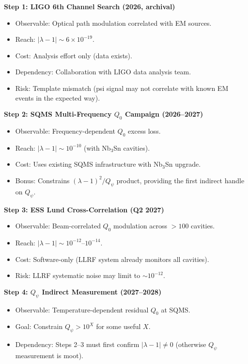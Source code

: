 \documentclass[11pt]{article}
\newcommand{\lam}{\lambda}
\newcommand{\ee}[1]{\times 10^{#1}}
\newcommand{\Qpsi}{Q_\psi}
\newcommand{\lbone}{|\lam - 1|}
\theoremstyle{definition}
\theoremstyle{remark}
\begin{document}
\begin{tcolorbox}[colback=blue!5!white, colframe=blue!50!black,
  title=\textbf{W3i6 P2 Optimal Detection Programme}]

\textbf{Step 1: LIGO 6th Channel Search (2026, archival)}
\begin{itemize}[nosep]
\item Observable: Optical path modulation correlated with EM sources.
\item Reach: $\lbone \sim 6\ee{-19}$.
\item Cost: Analysis effort only (data exists).
\item Dependency: Collaboration with LIGO data analysis team.
\item Risk: Template mismatch (psi signal may not correlate with known
  EM events in the expected way).
\end{itemize}

\textbf{Step 2: SQMS Multi-Frequency $Q_0$ Campaign (2026--2027)}
\begin{itemize}[nosep]
\item Observable: Frequency-dependent $Q_0$ excess loss.
\item Reach: $\lbone \sim 10^{-10}$ (with Nb$_3$Sn cavities).
\item Cost: Uses existing SQMS infrastructure with Nb$_3$Sn upgrade.
\item Bonus: Constrains $(\lam-1)^2/\Qpsi$ product, providing the first
  indirect handle on $\Qpsi$.
\end{itemize}

\textbf{Step 3: ESS Lund Cross-Correlation (Q2 2027)}
\begin{itemize}[nosep]
\item Observable: Beam-correlated $Q_0$ modulation across $>100$ cavities.
\item Reach: $\lbone \sim 10^{-12}$--$10^{-14}$.
\item Cost: Software-only (LLRF system already monitors all cavities).
\item Risk: LLRF systematic noise may limit to $\sim 10^{-12}$.
\end{itemize}

\textbf{Step 4: $\Qpsi$ Indirect Measurement (2027--2028)}
\begin{itemize}[nosep]
\item Observable: Temperature-dependent residual $Q_0$ at SQMS.
\item Goal: Constrain $\Qpsi > 10^{X}$ for some useful $X$.
\item Dependency: Steps 2--3 must first confirm $\lbone \neq 0$
  (otherwise $\Qpsi$ measurement is moot).
\end{itemize}


\end{tcolorbox}
\end{document}
